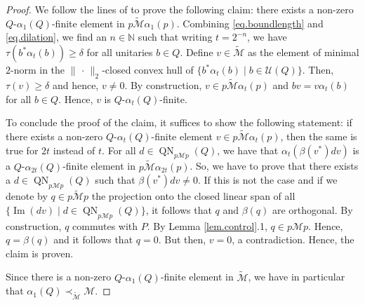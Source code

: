 \documentclass[a4paper,11pt]{amsart}
\numberwithin{equation}{section}
\begin{document}
\begin{proof}
We follow the lines of \cite[Proof of Lemma 5.2]{Va07} to prove the following claim: there exists a non-zero $Q$-${\alpha}_1(Q)$-finite element in $p {\widetilde{\mathcal{M}}} {\alpha}_1(p)$. Combining \eqref{eq.boundlength} and \eqref{eq.dilation}, we find an $n \in {\mathbb{N}}$ such that writing $t = 2^{-n}$, we have $\tau(b^* {\alpha}_t(b)) {\geqslant} \delta$ for all unitaries $b \in Q$. Define $v \in {\widetilde{\mathcal{M}}}$ as the element of minimal $2$-norm in the $\| \, \cdot \, \|_2$-closed convex hull of $\{ b^* {\alpha}_{t}(b) \mid b \in {\mathcal{U}}(Q)\}$. Then, $\tau(v) {\geqslant} \delta$ and hence, $v \neq 0$. By construction, $v \in p {\widetilde{\mathcal{M}}} {\alpha}_t(p)$ and $b v = v {\alpha}_{t}(b)$ for all $b \in Q$. Hence, $v$ is $Q$-${\alpha}_t(Q)$-finite.

To conclude the proof of the claim, it suffices to show the following statement: if there exists a non-zero $Q$-${\alpha}_t(Q)$-finite element $v \in p {\widetilde{\mathcal{M}}} {\alpha}_t(p)$, then the same is true for $2t$ instead of $t$. For all $d \in {\operatorname{QN}}_{p {\mathcal{M}} p}(Q)$, we have that ${\alpha}_t({\beta}(v^*) d v)$ is a $Q$-${\alpha}_{2t}(Q)$-finite element in $p {\widetilde{\mathcal{M}}} {\alpha}_{2t}(p)$. So, we have to prove that there exists a $d \in {\operatorname{QN}}_{p {\mathcal{M}} p}(Q)$ such that ${\beta}(v^*) d v \neq 0$. If this is not the case and if we denote by $q \in p{\widetilde{\mathcal{M}}} p$ the projection onto the closed linear span of all $\{ {\operatorname{Im}}(dv) \mid d \in {\operatorname{QN}}_{p {\mathcal{M}} p}(Q)\}$, it follows that $q$ and ${\beta}(q)$ are orthogonal. By construction, $q$ commutes with $P$. By Lemma \ref{lem.control}.1, $q \in p {\mathcal{M}} p$. Hence, $q = {\beta}(q)$ and it follows that $q = 0$. But then, $v = 0$, a contradiction. Hence, the claim is proven.

Since there is a non-zero $Q$-${\alpha}_1(Q)$-finite element in ${\widetilde{\mathcal{M}}}$, we have in particular that ${\alpha}_1(Q) \prec_{\widetilde{\mathcal{M}}} {\mathcal{M}}$.


\end{proof}
\end{document}
